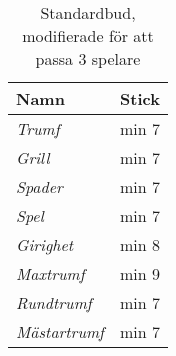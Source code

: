%
%
%

\begin{table}
	\caption{Standardbud, modifierade för att passa $3$ spelare}\label{tab:standardBids3}
	\begin{center}
		\begin{tabular}{l|c}
			\textbf{Namn} & \textbf{Stick}
			\\ \hline
			\textit{Trumf} & min 7 \\
			\textit{Grill} & min 7 \\
			\textit{Spader} & min 7 \\
			\textit{Spel} & min 7 \\
			\textit{Girighet} & min 8 \\
			\textit{Maxtrumf} & min 9 \\
			\textit{Rundtrumf} & min 7 \\
			\textit{Mästartrumf} & min 7
		\end{tabular}
	\end{center}
\end{table}
